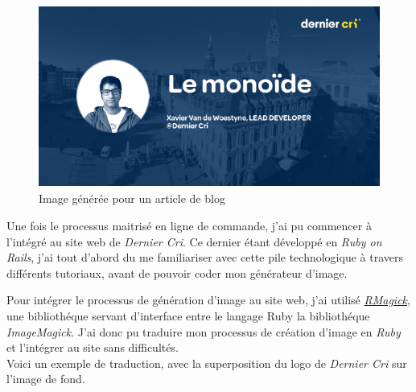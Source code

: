\begin{figure}[h]
  \centering
  \includegraphics[height=6cm]{figures/blog.png}
  \caption{Image générée pour un article de blog}
\end{figure}

\bigskip

Une fois le processus maitrisé en ligne de commande, j'ai pu commencer à
l'intégré au site web de \emph{Dernier Cri}. Ce dernier étant développé
en \emph{Ruby on Rails}, j'ai tout d'abord du me familiariser avec cette
pile technologique à travers différents tutoriaux, avant de pouvoir
coder mon générateur d'image.

\bigskip

Pour intégrer le processus de génération d'image au site web, j'ai
utilisé \href{https://github.com/rmagick/rmagick}{\emph{RMagick}}, une
bibliothéque servant d'interface entre le langage Ruby la bibliothéque
\emph{ImageMagick}. J'ai donc pu traduire mon processus de création
d'image en \emph{Ruby} et l'intégrer au site sans difficultés.\\
Voici un exemple de traduction, avec la superposition du logo de
\emph{Dernier Cri} sur l'image de fond.

\begin{Shaded}
\begin{Highlighting}[]
 \NormalTok{\textbackslash{}}
  \DataTypeTok{\textbackslash{}(}  \DataTypeTok{\textbackslash{})} \NormalTok{\textbackslash{}}
\end{Highlighting}
\end{Shaded}

\begin{Shaded}
\begin{Highlighting}[]
 
  \NormalTok{::}

    \NormalTok{::}\NormalTok{,}
    \NormalTok{,}
    \NormalTok{,}
    \NormalTok{::}
  \NormalTok{)}
\end{Highlighting}
\end{Shaded}

